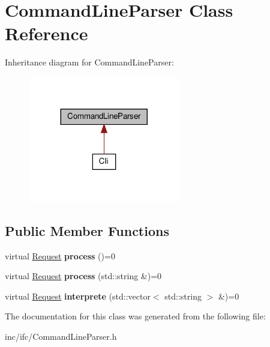 \hypertarget{classCommandLineParser}{}\section{Command\+Line\+Parser Class Reference}
\label{classCommandLineParser}


Inheritance diagram for Command\+Line\+Parser\+:\nopagebreak
\begin{figure}[H]
\begin{center}
\leavevmode
\includegraphics[width=188pt]{classCommandLineParser__inherit__graph}
\end{center}
\end{figure}
\subsection*{Public Member Functions}
\begin{DoxyCompactItemize}
\item 
\mbox{\label{classCommandLineParser_a40f670282d5f52b4a2bcf61701e016e3}} 
virtual \hyperlink{classRequest}{Request} {\bfseries process} ()=0
\item 
\mbox{\label{classCommandLineParser_a0449154ff3be82b1ee2c125af2874f49}} 
virtual \hyperlink{classRequest}{Request} {\bfseries process} (std\+::string \&)=0
\item 
\mbox{\label{classCommandLineParser_a7ed2465a960c5cee78d324922214ec1c}} 
virtual \hyperlink{classRequest}{Request} {\bfseries interprete} (std\+::vector$<$ std\+::string $>$ \&)=0
\end{DoxyCompactItemize}


The documentation for this class was generated from the following file\+:\begin{DoxyCompactItemize}
\item 
inc/ifc/Command\+Line\+Parser.\+h\end{DoxyCompactItemize}
